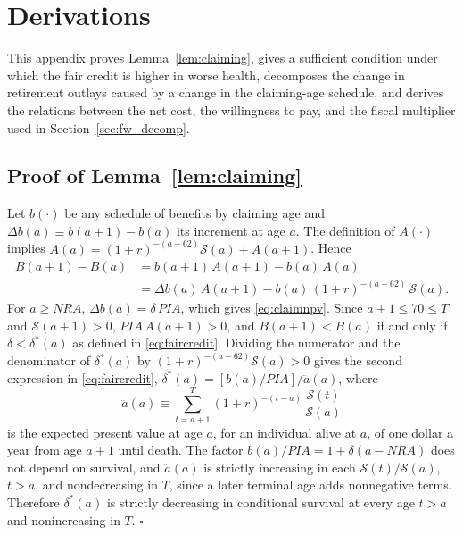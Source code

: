 \section{Derivations}\label{app:derivations}

This appendix proves Lemma~\ref{lem:claiming}, gives a sufficient condition under which the fair credit is higher in worse health, decomposes the change in retirement outlays caused by a change in the claiming-age schedule, and derives the relations between the net cost, the willingness to pay, and the fiscal multiplier used in Section~\ref{sec:fw_decomp}.

\subsection{Proof of Lemma~\ref{lem:claiming}}

Let $b(\cdot)$ be any schedule of benefits by claiming age and $\Delta b(a)\equiv b(a+1)-b(a)$ its increment at age $a$. The definition of $A(\cdot)$ implies $A(a)=(1+r)^{-(a-62)}\mathcal{S}(a)+A(a+1)$. Hence
\begin{equation*}
\begin{split}
B(a+1)-B(a)&=b(a+1)\,A(a+1)-b(a)\,A(a)\\
&=\Delta b(a)\,A(a+1)-b(a)\,(1+r)^{-(a-62)}\,\mathcal{S}(a).
\end{split}
\end{equation*}
For $a\geq\mathit{NRA}$, $\Delta b(a)=\delta\,\mathit{PIA}$, which gives \eqref{eq:claimnpv}. Since $a+1\leq 70\leq T$ and $\mathcal{S}(a+1)>0$, $\mathit{PIA}\,A(a+1)>0$, and $B(a+1)<B(a)$ if and only if $\delta<\delta^{*}(a)$ as defined in \eqref{eq:faircredit}. Dividing the numerator and the denominator of $\delta^{*}(a)$ by $(1+r)^{-(a-62)}\mathcal{S}(a)>0$ gives the second expression in \eqref{eq:faircredit}, $\delta^{*}(a)=[b(a)/\mathit{PIA}]/\ddot a(a)$, where
\begin{equation*}
\ddot a(a)\equiv\sum_{t=a+1}^{T}(1+r)^{-(t-a)}\,\frac{\mathcal{S}(t)}{\mathcal{S}(a)}
\end{equation*}
is the expected present value at age $a$, for an individual alive at $a$, of one dollar a year from age $a+1$ until death. The factor $b(a)/\mathit{PIA}=1+\delta(a-\mathit{NRA})$ does not depend on survival, and $\ddot a(a)$ is strictly increasing in each $\mathcal{S}(t)/\mathcal{S}(a)$, $t>a$, and nondecreasing in $T$, since a later terminal age adds nonnegative terms. Therefore $\delta^{*}(a)$ is strictly decreasing in conditional survival at every age $t>a$ and nonincreasing in $T$. \hfill$\square$

